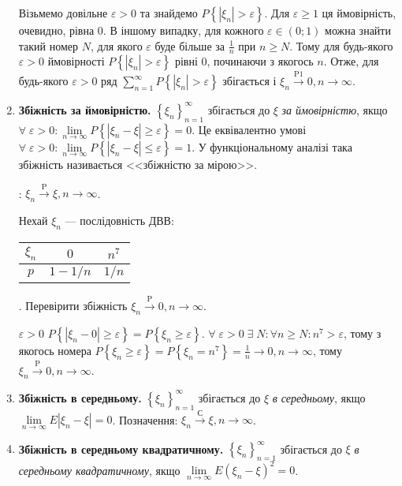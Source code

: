 \begin{enumerate}
\begin{example}
        Візьмемо довільне $\varepsilon > 0$ та знайдемо $P\left\{ |\xi_n| > \varepsilon\right\}$. Для $\varepsilon \geq 1$
        ця ймовірність, очевидно, рівна 0. В іншому випадку, для кожного $\varepsilon \in (0; 1)$ можна знайти такий номер $N$,
        для якого $\varepsilon$ буде більше за $\frac{1}{n}$ при $n \geq N$. Тому для будь-якого $\varepsilon >0$ ймовірності
        $P\left\{ |\xi_n| > \varepsilon\right\}$ рівні 0, починаючи з якогось $n$. Отже, для будь-якого $\varepsilon >0$ ряд 
        $\sum\limits_{n=1}^{\infty} P\left\{\left| \xi_n \right| > \varepsilon\right\}$ збігається і 
        $\xi_n \overset{\mathrm{P1}}{\longrightarrow} 0, n \to \infty$.
    \end{example}
    \item \textbf{Збіжність за ймовірністю.}
    \noindent$\left\{ \xi_n\right\}_{n=1}^{\infty}$ збігається до $\xi$ \emph{за ймовірністю}, якщо 
    $\forall \; \varepsilon > 0: \underset{n \to \infty}{\lim} P\left\{|\xi_n - \xi| \geq \varepsilon\right\}= 0$.
    Це еквівалентно умові $\forall \; \varepsilon > 0: \underset{n \to \infty}{\lim} P\left\{|\xi_n - \xi| \leq \varepsilon\right\}= 1$.
    У функціональному аналізі така збіжність називається <<збіжністю за мірою>>.

    : $\xi_n \overset{\mathrm{P}}{\longrightarrow} \xi, n \to \infty$.
    \begin{example}
        Нехай $\xi_n$ --- послідовність ДВВ: 
        \begin{tabular}{|c|c|c|}
            \hline
            $\xi_n$ & $0$ & $n^7$ \\
            \hline
            $p$ & $1-1/n$ & $1/n$ \\
            \hline
        \end{tabular}.
        Перевірити збіжність $\xi_n \overset{\mathrm{P}}{\longrightarrow} 0, n \to \infty$.
        
         $\varepsilon >0$ $P\left\{|\xi_n -0| \geq \varepsilon\right\} = P\left\{ \xi_n \geq \varepsilon\right\}$.
        $\forall \; \varepsilon >0 \; \exists \; N: \forall n\geq N:n^7 > \varepsilon$, тому з якогось номера
        $P\left\{ \xi_n \geq \varepsilon\right\} = P\left\{ \xi_n = n^7 \right\} = \frac{1}{n} \to 0, n\to\infty$, тому $\xi_n \overset{\mathrm{P}}{\longrightarrow} 0, n \to \infty$.
    \end{example}
    \item \textbf{Збіжність в середньому.}
    \noindent$\left\{ \xi_n\right\}_{n=1}^{\infty}$ збігається до $\xi$ \emph{в середньому},
    якщо $\underset{n \to \infty}{\lim} E|\xi_n - \xi| = 0$.
    Позначення: $\xi_n \overset{\text{С}}{\longrightarrow} \xi, n \to \infty$.
    \item \textbf{Збіжність в середньому квадратичному.}
    \noindent$\left\{ \xi_n\right\}_{n=1}^{\infty}$ збігається до $\xi$ \emph{в середньому квадратичному},
    якщо $\underset{n \to \infty}{\lim} E(\xi_n - \xi)^2 = 0$.
    

\end{enumerate}
